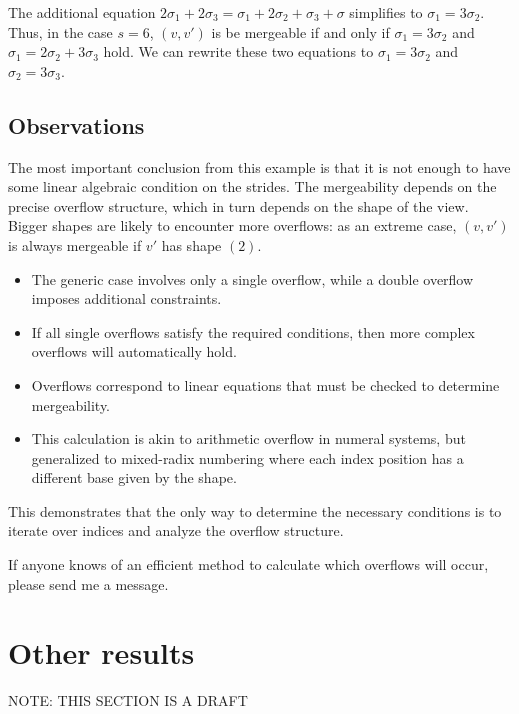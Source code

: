 \documentclass{article}
\theoremstyle{definition} %
\begin{document}
The additional equation $2\sigma_1 + 2\sigma_3 = \sigma_1 + 2\sigma_2 + \sigma_3 + \sigma$ simplifies to $\sigma_1 = 3 \sigma_2$.
Thus, in the case $s = 6$, $(v, v')$ is be mergeable if and only if $\sigma_1 = 3\sigma_2$ and $\sigma_1 = 2\sigma_2 + 3\sigma_3$ hold.
We can rewrite these two equations to $\sigma_1 = 3\sigma_2$ and $\sigma_2 = 3\sigma_3$.

\subsection{Observations}

The most important conclusion from this example
is that it is not enough to have some linear algebraic condition on the strides.
The mergeability depends on the precise overflow structure,
which in turn depends on the shape of the view.
Bigger shapes are likely to encounter more overflows: as an extreme case,
$(v, v')$ is always mergeable if $v'$ has shape $(2)$.

\begin{itemize}
  \item The generic case involves only a single overflow, while a double overflow imposes additional constraints.
  \item If all single overflows satisfy the required conditions, then more complex overflows will automatically hold.
  \item Overflows correspond to linear equations that must be checked to determine mergeability.
  \item This calculation is akin to arithmetic overflow in numeral systems, but generalized to mixed-radix numbering where each index position has a different base given by the shape.
\end{itemize}

This demonstrates that the only way to determine the necessary conditions is to iterate over indices and analyze the overflow structure.

If anyone knows of an efficient method to calculate which overflows will occur, please send me a message.

\section{Other results}

NOTE: THIS SECTION IS A DRAFT
\end{document}
